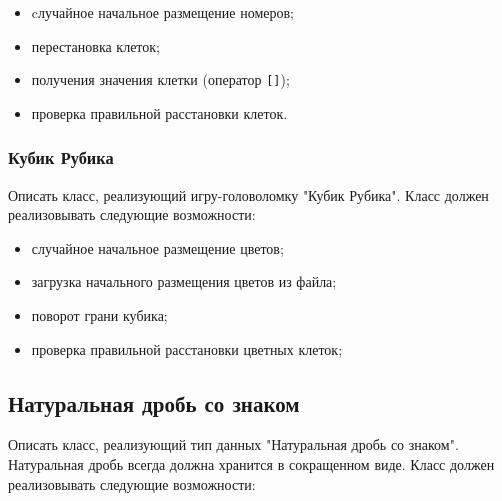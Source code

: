 \documentclass[a4paper,12pt]{article}
\begin{document}
\begin{itemize}
\item cлучайное начальное размещение номеров;
\item перестановка клеток;
\item получения значения клетки (оператор \lstinline|[]|);
\item проверка правильной расстановки клеток.
\end{itemize}

\subsubsection{Кубик Рубика}

Описать класс, реализующий игру-головоломку "Кубик Рубика".  Класс
должен реализовывать следующие возможности:

\begin{itemize}
\item случайное начальное размещение цветов;
\item загрузка начального размещения цветов из файла;
\item поворот грани кубика;
\item проверка правильной расстановки цветных клеток;
\end{itemize}


\subsection{Натуральная дробь со знаком}

Описать класс, реализующий тип данных "Натуральная дробь со
знаком". Натуральная дробь всегда должна хранится в сокращенном виде.
Класс должен реализовывать следующие возможности:
\end{document}
